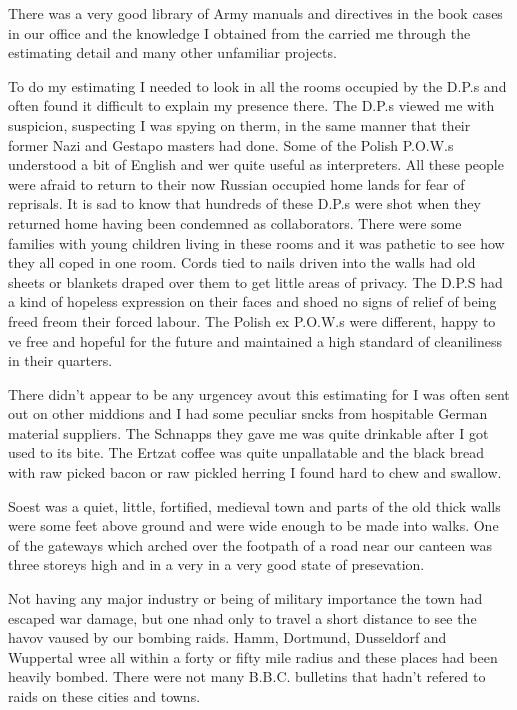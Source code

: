 There was a very good library of Army manuals and directives in the
book cases in our office and the knowledge I obtained from the carried
me through the estimating detail and many other unfamiliar projects.

To do my estimating I needed to look in all the rooms occupied by the
D.P.s and often found it difficult to explain my presence there. The
D.P.s viewed me with suspicion, suspecting I was spying on therm, in
the same manner that their former Nazi and Gestapo masters had
done. Some of the Polish P.O.W.s understood a bit of English and wer
quite useful as interpreters. All these people were afraid to return
to their now Russian occupied home lands for fear of reprisals. It is
sad to know that hundreds of these D.P.s were shot when they returned
home having been condemned as collaborators. There were some families
with young children living in these rooms and it was pathetic to see
how they all coped in one room. Cords tied to nails driven into the
walls had old sheets or blankets draped over them to get little areas
of privacy. The D.P.S had a kind of hopeless expression on their faces
and shoed no signs of relief of being freed freom their forced
labour. The Polish ex P.O.W.s were different, happy to ve free and
hopeful for the future and maintained a high standard of cleaniliness
in their quarters.

There didn't appear to be any urgencey avout this estimating for I was
often sent out on other middions and I had some peculiar sncks from
hospitable German material suppliers. The Schnapps they gave me was
quite drinkable after I got used to its bite. The Ertzat coffee was
quite unpallatable and the black bread with raw picked bacon or raw
pickled herring I found hard to chew and swallow.

Soest was a quiet, little, fortified, medieval town and parts of the
old thick walls were some feet above ground and were wide enough to be
made into walks. One of the gateways which arched over the footpath of
a road near our canteen was three storeys high and in a very in a very
good state of presevation.

Not having any major industry or being of military importance the town
had escaped war damage, but one nhad only to travel a short distance
to see the havov vaused by our bombing raids. Hamm, Dortmund,
Dusseldorf and Wuppertal wree all within a forty or fifty mile radius
and these places had been heavily bombed. There were not many
B.B.C. bulletins that hadn't refered to raids on these cities and
towns.

